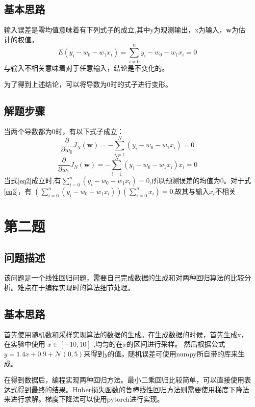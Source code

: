 \documentclass[final]{cvpr}
\begin{document}
\subsection{基本思路}
输入误差是零均值意味着有下列式子的成立,其中y为观测输出，x为输入，$\mathbf{w}$为估计的权值。
\begin{equation}
    E(y_i-w_0-w_1x_i)=\sum_{i=0}^n y_i-w_0-w_1x_i=0
\label{eq1}
\end{equation}
与输入不相关意味着对于任意输入，结论是不变化的。\par
为了得到上述结论，可以将导数为0时的式子进行变形。
\subsection{解题步骤}
当两个导数都为0时，有以下式子成立：
\begin{equation}
    \frac{\partial}{\partial w_{0}} J_{N}(\mathbf{w})=-\sum_{i=1}^{N}\left(y_{i}-w_{0}-w_{1} x_{i}\right)=0 
\label{eq2}
\end{equation}
\begin{equation}
    \frac{\partial}{\partial w_{1}} J_{N}(\mathbf{w})=-\sum_{i=1}^{N}\left(y_{i}-w_{0}-w_{1} x_{i}\right) x_{i}=0
\label{eq3}
\end{equation}
当式\ref{eq2}成立时,有$\sum_{i=0}^n(y_i-w_0-w_1x_i)=0$,所以预测误差的均值为0。对于式\ref{eq3}，有
$(\sum_{i=0}^n(y_i-w_0-w_1x_i))(\sum_{i=0}^nx_i)=0$,故其与输入$x_i$不相关
\section{第二题}\label{sec:Experiment}
\subsection{问题描述}
该问题是一个线性回归问题，需要自己完成数据的生成和对两种回归算法的比较分析。难点在于编程实现时的算法细节处理。
\subsection{基本思路}
首先使用随机数和采样实现算法的数据的生成。在生成数据的时候，首先生成x，在实验中使用 $x \in [-10,10]$ ,均匀的在$x$的区间进行采样。
然后根据公式$y = 1.4x+0.9 + \mathcal{N}(0,5)$来得到$y$的值。随机误差可使用numpy所自带的库来生成。\par
在得到数据后，编程实现两种回归方法。最小二乘回归比较简单，可以直接使用表达式得到最终的结果。Huber损失函数的鲁棒线性回归方法则需要使用梯度下降法
来进行求解。梯度下降法可以使用pytorch进行实现。
\end{document}
